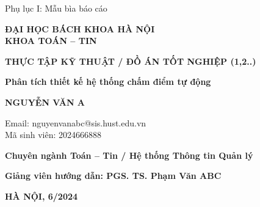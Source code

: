 \documentclass[12pt,a4paper]{report}
\makeatletter
\newcommand{\tenDeTai}{Phân tích thiết kế hệ thống chấm điểm tự động}
\newcommand{\tenSinhVien}{NGUYỄN VĂN A}
\newcommand{\emailSinhVien}{nguyenvanabc@sis.hust.edu.vn}
\newcommand{\maSinhVien}{2024666888}
\newcommand{\chuyenNganh}{Toán -- Tin / Hệ thống Thông tin Quản lý}
\newcommand{\tenGVHD}{PGS. TS. Phạm Văn ABC}
\newcommand{\thangNam}{6/2024}
\newcommand{\loaiBaoCao}{THỰC TẬP KỸ THUẬT / ĐỒ ÁN TỐT NGHIỆP (1,2..)}
\makeatother
\begin{document}
\fontsize{13}{16}\selectfont  %
\pagestyle{empty}  %

\begin{center}

    {\fontsize{13}{16}\selectfont Phụ lục I: Mẫu bìa báo cáo}

    \vspace{0.5cm}

    {\fontsize{14}{18}\selectfont\bfseries ĐẠI HỌC BÁCH KHOA HÀ NỘI}\\[4pt]
    {\fontsize{14}{18}\selectfont\bfseries KHOA TOÁN -- TIN}

    \vspace{5cm}

    {\fontsize{18}{22}\selectfont\bfseries \loaiBaoCao}

    \vspace{1.5cm}

    {\fontsize{14}{18}\selectfont\bfseries \tenDeTai}

    \vspace{1cm}

    {\fontsize{14}{18}\selectfont\bfseries \tenSinhVien}

    \vspace{0.6cm}

    {\fontsize{14}{18}\selectfont Email: \emailSinhVien}\\[4pt]
    {\fontsize{14}{18}\selectfont Mã sinh viên: \maSinhVien}

    \vspace{0.6cm}

    {\fontsize{14}{18}\selectfont\bfseries Chuyên ngành \chuyenNganh}

    \vfill

    \begin{flushleft}
        \hspace{2cm}
        \begin{minipage}{0.6\textwidth}
            {\fontsize{13}{16}\selectfont\bfseries Giảng viên hướng dẫn: \tenGVHD}\\[8pt]
        \end{minipage}
    \end{flushleft}

    \vspace{1.5cm}

    {\fontsize{13}{16}\selectfont\bfseries HÀ NỘI, \thangNam}

\end{center}
\end{document}
